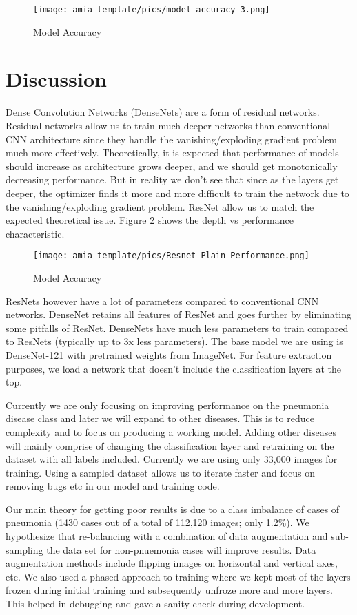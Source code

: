 \documentclass{amia}
\begin{document}
\begin{figure}[h!]
\centering
\texttt{[image: amia\_template/pics/model\_accuracy\_3.png]}
\caption{Model Accuracy}
\label{fig2}
\end{figure}


\section*{Discussion}
Dense Convolution Networks (DenseNets) are a form of residual networks. Residual networks allow us to train much deeper networks than conventional CNN architecture since they handle the vanishing/exploding gradient problem much more effectively. Theoretically, it is expected that performance of models should increase as architecture grows deeper, and we should get monotonically decreasing performance. But in reality we don't see that since as the layers get deeper, the optimizer finds it more and more difficult to train the network due to the vanishing/exploding gradient problem. ResNet allow us to match the expected theoretical issue. Figure \ref{fig3} shows the depth vs performance characteristic.

\begin{figure}[h!]
\centering
\texttt{[image: amia\_template/pics/Resnet-Plain-Performance.png]}
\caption{Model Accuracy}
\label{fig3}
\end{figure}


ResNets however have a lot of parameters compared to conventional CNN networks. DenseNet retains all features of ResNet and goes further by eliminating some pitfalls of ResNet. DenseNets have much less parameters to train compared to ResNets (typically up to 3x less parameters). The base model we are using is DenseNet-121 with pretrained weights from ImageNet. For feature extraction purposes, we load a network that doesn't include the classification layers at the top.

Currently we are only focusing on improving performance on the pneumonia disease class and later we will expand to other diseases. This is to reduce complexity and to focus on producing a working model. Adding other diseases will mainly comprise of changing the classification layer and retraining on the dataset with all labels included. Currently we are using only 33,000 images for training. Using a sampled dataset allows us to iterate faster and focus on removing bugs etc in our model and training code.

Our main theory for getting poor results is due to a class imbalance of cases of pneumonia (1430 cases out of a total of 112,120 images; only 1.2\%). We hypothesize that re-balancing with a combination of data augmentation and sub-sampling the data set for non-pnuemonia cases will improve results. Data augmentation methods include  flipping images on horizontal and vertical axes, etc. We also used a phased approach to training where we kept most of the layers frozen during initial training and subsequently unfroze more and more layers. This helped in debugging and gave a sanity check during development.
\end{document}

